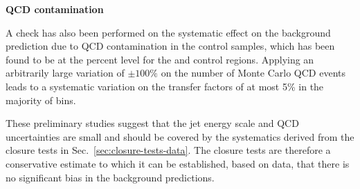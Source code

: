 {\bf QCD contamination}

A check has also been performed on the systematic effect on the
background prediction due to QCD contamination in the control samples,
which has been found to be at the percent level for the \mj and \gj
control regions. Applying an arbitrarily large variation of $\pm
100\%$ on the number of Monte Carlo QCD events leads to a systematic
variation on the transfer factors of at most 5\% in the majority of
bins.

These preliminary studies suggest that the jet energy scale and QCD
uncertainties are small and should be covered by the systematics
derived from the closure tests in
Sec.~\ref{sec:closure-tests-data}. The closure tests are therefore a
conservative estimate to which it can be established, based on data,
that there is no significant bias in the background predictions. 

